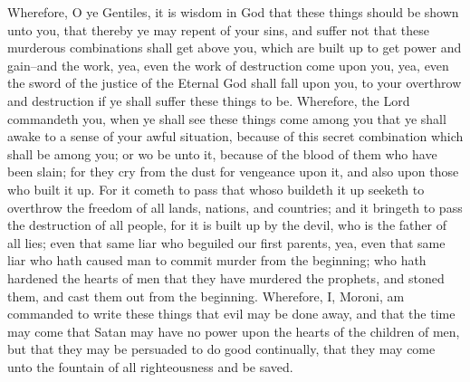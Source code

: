 Wherefore, O ye Gentiles, it is wisdom in God that these things should be shown unto you, that thereby ye may repent of your sins, and suffer not that these murderous combinations shall get above you, which are built up to get power and gain--and the work, yea, even the work of destruction come upon you, yea, even the sword of the justice of the Eternal God shall fall upon you, to your overthrow and destruction if ye shall suffer these things to be.
\bverse \iffalse Wherefore, the Lord commandeth you, when ye shall see these things come among you that ye shall awake to a sense of your awful situation, because of this secret combination which shall be among you; or wo be unto it, because of the blood of them who have been slain; for they cry from the dust for vengeance upon it, and also upon those who built it up. \fi
Wherefore, the Lord commandeth you, when ye shall see these things come among you that ye shall awake to a sense of your awful situation, because of this secret combination which shall be among you; or wo be unto it, because of the blood of them who have been slain; for they cry from the dust for vengeance upon it, and also upon those who built it up.
\bverse \iffalse For it cometh to pass that whoso buildeth it up seeketh to overthrow the freedom of all lands, nations, and countries; and it bringeth to pass the destruction of all people, for it is built up by the devil, who is the father of all lies; even that same liar who beguiled our first parents, yea, even that same liar who hath caused man to commit murder from the beginning; who hath hardened the hearts of men that they have murdered the prophets, and stoned them, and cast them out from the beginning. \fi
For it cometh to pass that whoso buildeth it up seeketh to overthrow the freedom of all lands, nations, and countries; and it bringeth to pass the destruction of all people, for it is built up by the devil, who is the father of all lies; even that same liar who beguiled our first parents, yea, even that same liar who hath caused man to commit murder from the beginning; who hath hardened the hearts of men that they have murdered the prophets, and stoned them, and cast them out from the beginning.
\bverse \iffalse Wherefore, I, Moroni, am commanded to write these things that evil may be done away, and that the time may come that Satan may have no power upon the hearts of the children of men, but that they may be persuaded to do good continually, that they may come unto the fountain of all righteousness and be saved. \fi
Wherefore, I, Moroni, am commanded to write these things that evil may be done away, and that the time may come that Satan may have no power upon the hearts of the children of men, but that they may be persuaded to do good continually, that they may come unto the fountain of all righteousness and be saved.

